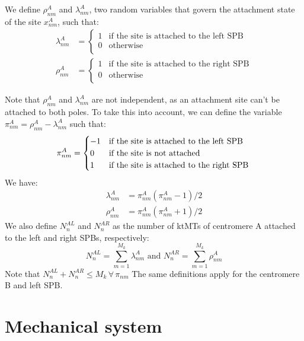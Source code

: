 \documentclass[a4paper,12pt]{article}
\renewcommand{\leq}{\leqslant}
\begin{document}
We define $\rho_{nm}^A$ and $\lambda_{nm}^A$, two random variables that govern
the attachment state of the site $x_{nm}^A$, such that:
\begin{align}
  \label{eq:rholambda}
  \lambda_{nm}^A &=
  \begin{cases}
    1 &\text{if the site is attached to the left SPB}\\
    0 &\text{otherwise}\\
  \end{cases}\\
  \rho_{nm}^A &= 
  \begin{cases}
    1 &\text{if the site is attached to the right SPB}\\
    0 &\text{otherwise}\\
  \end{cases}
\end{align}

Note that $\rho_{nm}^A$ and $\lambda_{nm}^A$ are not independent, as
an attachment site can't be attached to both poles. To take this into
account, we can define the variable $\pi_{nm}^A = \rho_{nm}^A -
\lambda_{nm}^A$ such that:
\begin{equation}
  \label{eq:pnm}
  \pi_{nm}^A = 
  \begin{cases}
    - 1 &\text{if the site is attached to the left SPB}\\
    0 &\text{if the site is not attached}\\
    1 &\text{if the site is attached to the right SPB}\\
  \end{cases}\\
\end{equation}
We have:
\begin{align}
  \lambda_{nm}^A &= \pi_{nm}^A\left(\pi_{nm}^A - 1\right)/2\\
  \rho_{nm}^A &= \pi_{nm}^A\left(\pi_{nm}^A + 1\right)/2
\end{align}
We also define $N_n^{AL}$ and $N_n^{AR}$ as the number of ktMTs of
centromere A attached to the left and right SPBs, respectively:
\begin{equation}
  \label{eq:NAL}
  N_n^{AL} = \sum_{m = 1}^{M_k}\lambda_{nm}^A \mbox{ and }%
  N_n^{AR} = \sum_{m = 1}^{M_k}\rho_{nm}^A 
\end{equation}
Note that $N_n^{AL} + N_n^{AR} \leq M_k\, \forall\, \pi_{nm} $
The same definitions apply for the centromere B and left SPB.

\section{Mechanical system}
\end{document}
